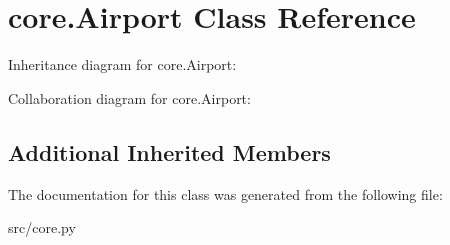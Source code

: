 \hypertarget{classcore_1_1_airport}{}\section{core.\+Airport Class Reference}
\label{classcore_1_1_airport}


Inheritance diagram for core.\+Airport\+:


Collaboration diagram for core.\+Airport\+:
\subsection*{Additional Inherited Members}


The documentation for this class was generated from the following file\+:\begin{DoxyCompactItemize}
\item 
src/core.\+py\end{DoxyCompactItemize}
